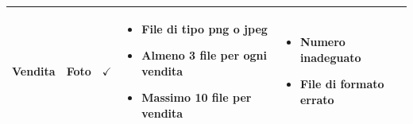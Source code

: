 \documentclass[12pt]{article}
\begin{document}
\begin{longtable}{|l|l|l|l|l|}
 \textbf{Vendita} & Foto & $\checkmark$ & \begin{minipage}{3.5cm}
 \vspace{5pt}
 \begin{itemize}
 \item File di tipo png o jpeg
 \item Almeno 3 file per ogni vendita
 \item Massimo 10 file per vendita
 \end{itemize}
 \vspace{5pt}
 \end{minipage} & \begin{minipage}{4cm}
 \vspace{5pt}
 \begin{itemize}
 \item Numero inadeguato
 \item File di formato errato
 \end{itemize}
 \vspace{5pt}
 \end{minipage} \\ \hline
 
 \end{longtable}
 
 \newpage
\end{document}
